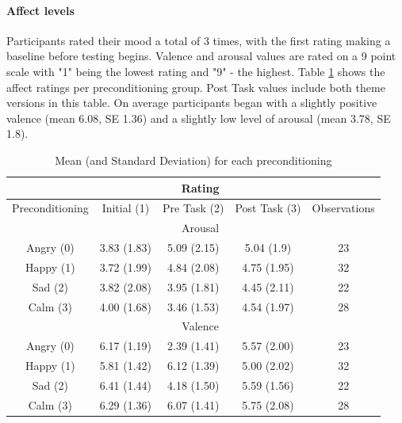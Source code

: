 	\paragraph{Affect levels} Participants rated their mood a total of 3 times, with the first rating making a baseline before testing begins. Valence and arousal values are rated on a 9 point scale with "1" being the lowest rating and "9" - the highest. Table \ref{tbl:distributionOfAffect} shows the affect ratings per preconditioning group. Post Task values include both theme versions in this table. On average participants began with a slightly positive valence (mean 6.08, SE 1.36) and a slightly low level of arousal (mean 3.78, SE 1.8). 
	
	\begin{table}[h!]
	\begin{center}
				
		\begin{tabular}{|c|c|c|c|c|}
			\hline 
			& \multicolumn{3}{c|}{Rating} &  \\ 
			\hline 
			Preconditioning & Initial (1) & Pre Task (2) & Post Task (3) & Observations \\ 
			\hline 
			& \multicolumn{3}{|c|}{Arousal} &  \\ 
			\hline 
			Angry (0) & 3.83 (1.83) & 5.09 (2.15) & 5.04 (1.9) & 23 \\ 
			\hline 
			Happy (1) & 3.72 (1.99) & 4.84 (2.08) & 4.75 (1.95) & 32 \\ 
			\hline 
			Sad (2) & 3.82 (2.08) & 3.95 (1.81) & 4.45 (2.11) & 22 \\ 
			\hline 
			Calm (3) & 4.00 (1.68) & 3.46 (1.53) & 4.54 (1.97) & 28 \\ 
			\hline 
			& \multicolumn{3}{|c|}{Valence} &  \\ 
			\hline 
			Angry (0) & 6.17 (1.19) & 2.39 (1.41) & 5.57 (2.00) & 23 \\ 
			\hline 
			Happy (1) & 5.81 (1.42) & 6.12 (1.39) & 5.00 (2.02) & 32 \\ 
			\hline 
			Sad (2) & 6.41 (1.44) & 4.18 (1.50) & 5.59 (1.56) & 22 \\ 
			\hline 
			Calm (3) & 6.29 (1.36) & 6.07 (1.41) & 5.75 (2.08) & 28 \\ 
			\hline 
		\end{tabular}
	\end{center}
	\caption{Mean (and Standard Deviation) for each preconditioning}
	\label{tbl:distributionOfAffect}
	\end{table}

